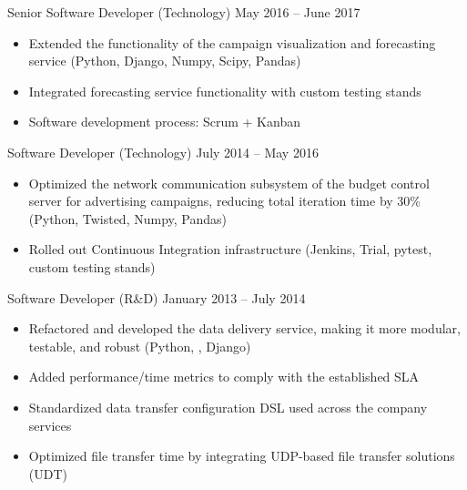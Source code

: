 \documentclass[unicode, 10pt, a4paper, oneside, fleqn]{article}
\begin{document}
{            {Senior Software Developer (Technology)}
            {May 2016 -- June 2017}
            {
                \begin{itemize}
                    \item{Extended the functionality of the campaign visualization and forecasting service (Python, Django, Numpy, Scipy, Pandas)}
                    \item{Integrated forecasting service functionality with custom testing stands}
                    \item{Software development process: Scrum + Kanban}
                \end{itemize}
            }
        \position  %
            {Software Developer (Technology)}
            {July 2014 -- May 2016}
            {
                \begin{itemize}
                    \item{Optimized the network communication subsystem of the
                        budget control server for advertising campaigns,
                    reducing total iteration time by 30\% (Python, Twisted,
                Numpy, Pandas)}
                    \item{Rolled out Continuous Integration infrastructure
                        (Jenkins, Trial, pytest, custom testing stands)}
                \end{itemize}
            }
        \position  %
            {Software Developer (R\&D)}
            {January 2013 -- July 2014}
            {
                \begin{itemize}
                    \item{Refactored and developed the data delivery service,
                        making it more modular, testable, and robust (Python,
                    , Django)}
                    \item{Added performance/time metrics to comply with the
                        established SLA}
                    \item{Standardized data transfer configuration DSL used
                        across the company services}
                    \item{Optimized file transfer time by integrating UDP-based
                        file transfer solutions (UDT)}
                \end{itemize}
            }
    }
\end{document}
